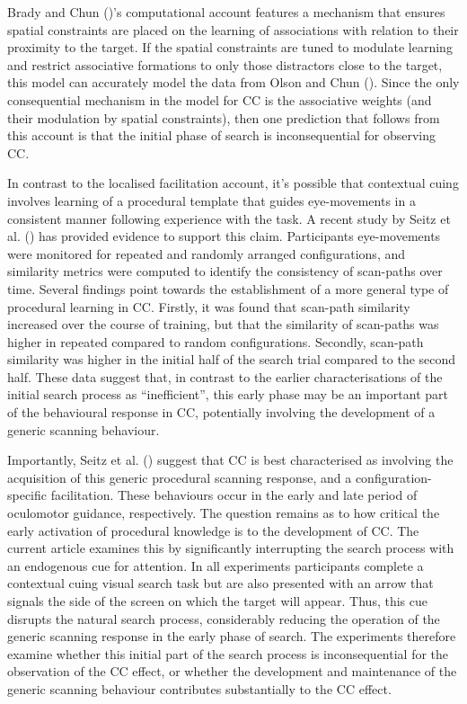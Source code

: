 \documentclass[
  man,
  floatsintext,
  longtable,
  nolmodern,
  notxfonts,
  notimes,
  colorlinks=true,linkcolor=blue,citecolor=blue,urlcolor=blue]{apa7}
\begin{document}
Brady and Chun ()'s computational account
features a mechanism that ensures spatial constraints are placed on the
learning of associations with relation to their proximity to the target.
If the spatial constraints are tuned to modulate learning and restrict
associative formations to only those distractors close to the target,
this model can accurately model the data from Olson and Chun
(). Since the only consequential mechanism
in the model for CC is the associative weights (and their modulation by
spatial constraints), then one prediction that follows from this account
is that the initial phase of search is inconsequential for observing CC.

In contrast to the localised facilitation account, it's possible that
contextual cuing involves learning of a procedural template that guides
eye-movements in a consistent manner following experience with the task.
A recent study by Seitz et al. () has
provided evidence to support this claim. Participants eye-movements were
monitored for repeated and randomly arranged configurations, and
similarity metrics were computed to identify the consistency of
scan-paths over time. Several findings point towards the establishment
of a more general type of procedural learning in CC. Firstly, it was
found that scan-path similarity increased over the course of training,
but that the similarity of scan-paths was higher in repeated compared to
random configurations. Secondly, scan-path similarity was higher in the
initial half of the search trial compared to the second half. These data
suggest that, in contrast to the earlier characterisations of the
initial search process as ``inefficient'', this early phase may be an
important part of the behavioural response in CC, potentially involving
the development of a generic scanning behaviour.

Importantly, Seitz et al. () suggest that
CC is best characterised as involving the acquisition of this generic
procedural scanning response, and a configuration-specific facilitation.
These behaviours occur in the early and late period of oculomotor
guidance, respectively. The question remains as to how critical the
early activation of procedural knowledge is to the development of CC.
The current article examines this by significantly interrupting the
search process with an endogenous cue for attention. In all experiments
participants complete a contextual cuing visual search task but are also
presented with an arrow that signals the side of the screen on which the
target will appear. Thus, this cue disrupts the natural search process,
considerably reducing the operation of the generic scanning response in
the early phase of search. The experiments therefore examine whether
this initial part of the search process is inconsequential for the
observation of the CC effect, or whether the development and maintenance
of the generic scanning behaviour contributes substantially to the CC
effect.
\end{document}

